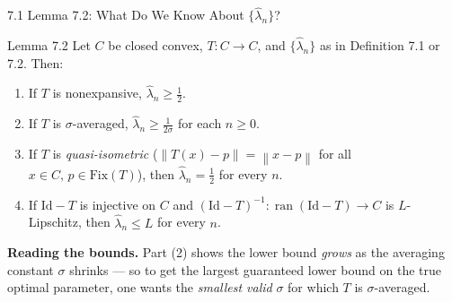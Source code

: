 \documentclass[aspectratio=169,10pt]{beamer}
\newcommand{\norm}[1]{\left\|#1\right\|}
\newcommand{\Fix}{\mathrm{Fix}}
\newcommand{\Id}{\mathrm{Id}}
\begin{document}
\begin{frame}{7.1 Lemma 7.2: What Do We Know About $\{\widehat\lambda_n\}$?}

  \begin{alertblock}{Lemma 7.2}
    Let $C$ be closed convex, $T:C\to C$, and $\{\widehat\lambda_n\}$
    as in Definition 7.1 or 7.2. Then:
    \begin{enumerate}
      \item If $T$ is nonexpansive, $\widehat\lambda_n\ge\tfrac12$.
      \item If $T$ is $\sigma$-averaged, $\widehat\lambda_n\ge
            \tfrac{1}{2\sigma}$ for each $n\ge0$.
      \item If $T$ is \emph{quasi-isometric}
            ($\norm{T(x)-p}=\norm{x-p}$ for all $x\in C,\,p\in\Fix(T)$),
            then $\widehat\lambda_n=\tfrac12$ for every $n$.
      \item If $\Id-T$ is injective on $C$ and
            $(\Id-T)^{-1}:\operatorname{ran}(\Id-T)\to C$ is
            $L$-Lipschitz, then $\widehat\lambda_n\le L$ for every $n$.
    \end{enumerate}
  \end{alertblock}

  \textbf{Reading the bounds.} Part (2) shows the lower bound
  \emph{grows} as the averaging constant $\sigma$ shrinks --- so to
  get the largest guaranteed lower bound on the true optimal
  parameter, one wants the \emph{smallest valid} $\sigma$ for which
  $T$ is $\sigma$-averaged.

\end{frame}
\end{document}
